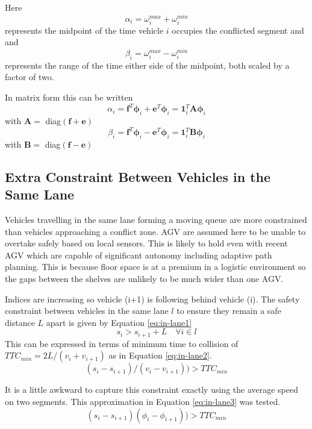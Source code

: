 Here
\begin{equation}
\alpha_i = \omega_i^{max} + \omega_i^{min}
\end{equation}
represents the midpoint of the time vehicle $i$ occupies the conflicted segment and and
\begin{equation}
\beta_i = \omega_i^{max} - \omega_i^{min}
\end{equation}
represents the range of the time either side of the midpoint, both scaled by a factor of two.

In matrix form this can be written
\begin{equation}
\label{eq:alpha_mat}
\alpha_i = \bm{f}^T\bm{\phi}_i + \bm{e}^T\bm{\phi}_i = \bm{1}_i^T\bm{A}\bm{\phi}_i
\end{equation}
with $\bm{A}= $ diag$(\bm{f} + \bm{e})$
\begin{equation}
\label{eq:beta_mat}
\beta_i = \bm{f}^T\bm{\phi}_i - \bm{e}^T\bm{\phi}_i = \bm{1}_i^T\bm{B}\bm{\phi}_i
\end{equation}
with $\bm{B}= $ diag$(\bm{f} - \bm{e})$

\subsection{Extra Constraint Between Vehicles in the Same Lane}
Vehicles travelling in the same lane forming a moving queue are more constrained than vehicles approaching a conflict zone. AGV are assumed here to be unable to overtake safely based on local sensors. This is likely to hold even with recent AGV which are capable of significant autonomy including adaptive path planning. This is because floor space is at a premium in a logistic environment so the gaps between the shelves are unlikely to be much wider than one AGV.

Indices are increasing so vehicle (i+1) is following behind vehicle (i). The safety constraint between vehicles in the same lane $l$ to ensure they remain a safe distance $L$ apart is given by Equation \ref{eq:in-lane1}
\begin{equation}
s_{i} > s_{i+1} + L \quad \forall i \in l
\label{eq:in-lane1}
\end{equation}
This can be expressed in terms of minimum time to collision of $TTC_{min} = 2 L/(v_i + v_{i+1})$ as in Equation \ref{eq:in-lane2}.
\begin{equation}
(s_{i}-s_{i+1})/(v_i - v_{i+1})) > TTC_{min}
\label{eq:in-lane2}
\end{equation}

It is a little awkward to capture this constraint exactly using the average speed on two segments. This approximation in Equation \ref{eq:in-lane3} was tested.
\begin{equation}
(s_{i}-s_{i+1})(\phi_i - \phi_{i+1})) > TTC_{min}
\label{eq:in-lane3}
\end{equation}  
